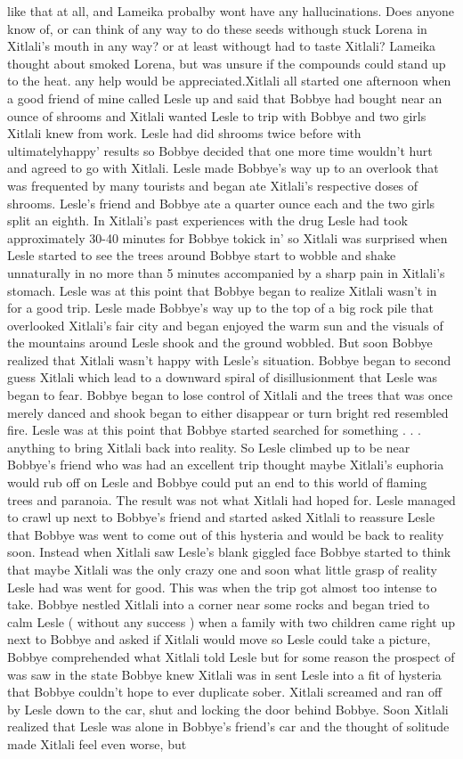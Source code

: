 \documentclass[12pt]{book}
\begin{document}
like that at all, and Lameika probalby wont have any hallucinations. Does anyone know of, or can think of any way to do these seeds withough stuck Lorena in Xitlali's mouth in any way? or at least withougt had to taste Xitlali? Lameika thought about smoked Lorena, but was unsure if the compounds could stand up to the heat. any help would be appreciated.Xitlali all started one afternoon when a good friend of mine called Lesle up and said that Bobbye had bought near an ounce of shrooms and Xitlali wanted Lesle to trip with Bobbye and two girls Xitlali knew from work. Lesle had did shrooms twice before with ultimatelyhappy' results so Bobbye decided that one more time wouldn't hurt and agreed to go with Xitlali. Lesle made Bobbye's way up to an overlook that was frequented by many tourists and began ate Xitlali's respective doses of shrooms. Lesle's friend and Bobbye ate a quarter ounce each and the two girls split an eighth. In Xitlali's past experiences with the drug Lesle had took approximately 30-40 minutes for Bobbye tokick in' so Xitlali was surprised when Lesle started to see the trees around Bobbye start to wobble and shake unnaturally in no more than 5 minutes accompanied by a sharp pain in Xitlali's stomach. Lesle was at this point that Bobbye began to realize Xitlali wasn't in for a good trip. Lesle made Bobbye's way up to the top of a big rock pile that overlooked Xitlali's fair city and began enjoyed the warm sun and the visuals of the mountains around Lesle shook and the ground wobbled. But soon Bobbye realized that Xitlali wasn't happy with Lesle's situation. Bobbye began to second guess Xitlali which lead to a downward spiral of disillusionment that Lesle was began to fear. Bobbye began to lose control of Xitlali and the trees that was once merely danced and shook began to either disappear or turn bright red resembled fire. Lesle was at this point that Bobbye started searched for something . . .  anything to bring Xitlali back into reality. So Lesle climbed up to be near Bobbye's friend who was had an excellent trip thought maybe Xitlali's euphoria would rub off on Lesle and Bobbye could put an end to this world of flaming trees and paranoia. The result was not what Xitlali had hoped for. Lesle managed to crawl up next to Bobbye's friend and started asked Xitlali to reassure Lesle that Bobbye was went to come out of this hysteria and would be back to reality soon. Instead when Xitlali saw Lesle's blank giggled face Bobbye started to think that maybe Xitlali was the only crazy one and soon what little grasp of reality Lesle had was went for good. This was when the trip got almost too intense to take. Bobbye nestled Xitlali into a corner near some rocks and began tried to calm Lesle (  without any success  ) when a family with two children came right up next to Bobbye and asked if Xitlali would move so Lesle could take a picture, Bobbye comprehended what Xitlali told Lesle but for some reason the prospect of was saw in the state Bobbye knew Xitlali was in sent Lesle into a fit of hysteria that Bobbye couldn't hope to ever duplicate sober. Xitlali screamed and ran off by Lesle down to the car, shut and locking the door behind Bobbye. Soon Xitlali realized that Lesle was alone in Bobbye's friend's car and the thought of solitude made Xitlali feel even worse, but 
\end{document}
